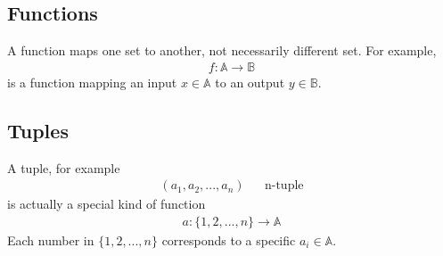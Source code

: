 \subsection{Functions}
A function maps one set to another, not necessarily different set. For example,
\begin{align}
    f: \mathbb{A} \to \mathbb{B}
\end{align}
is a function mapping an input $x \in \mathbb{A}$ to an output $y \in \mathbb{B}$.
\subsection{Tuples}
A tuple, for example
\begin{align}
    (a_1, a_2, ..., a_n) && \text{n-tuple}
\end{align}
is actually a special kind of function
\begin{align}
    a: \{ 1, 2, ..., n \} \to \mathbb{A}
\end{align}
Each number in $\{ 1, 2, ..., n \}$ corresponds to a specific $a_i \in \mathbb{A}$.

